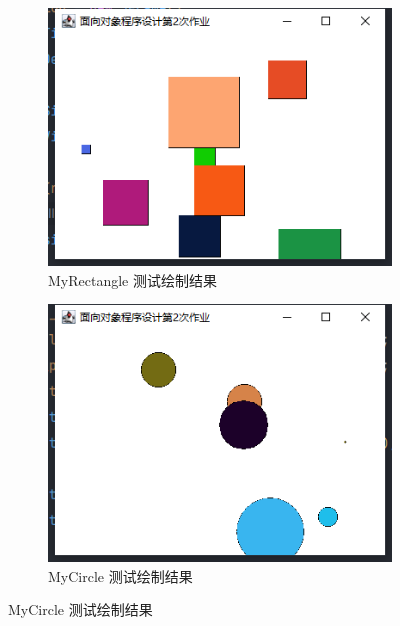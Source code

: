 \begin{figure}[H]
	\centering
	\begin{subfigure}{0.4\textwidth}
		\centering
		\includegraphics[width = 1\textwidth]{../pic/2/2.3.1.png}
		\caption{MyRectangle 测试绘制结果}
	\end{subfigure}
	\begin{subfigure}{0.4\linewidth}
		\centering
		\includegraphics[width = 1\textwidth]{../pic/2/2.3.2.png}
		\caption{MyCircle 测试绘制结果}
	\end{subfigure}
\end{figure}

